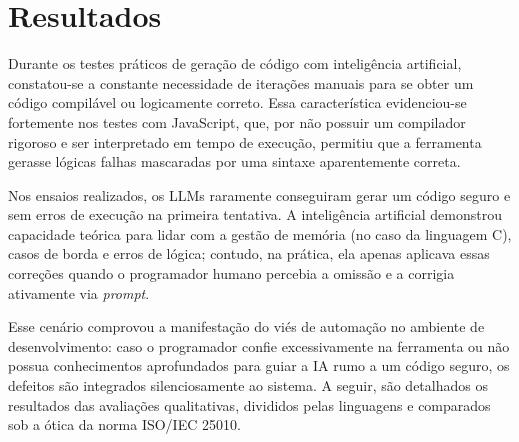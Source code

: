 \chapter{Resultados}

Durante os testes práticos de geração de código com inteligência artificial, constatou-se a constante necessidade de iterações manuais para se obter um código compilável ou logicamente correto. Essa característica evidenciou-se fortemente nos testes com JavaScript, que, por não possuir um compilador rigoroso e ser interpretado em tempo de execução, permitiu que a ferramenta gerasse lógicas falhas mascaradas por uma sintaxe aparentemente correta. 

Nos ensaios realizados, os LLMs raramente conseguiram gerar um código seguro e sem erros de execução na primeira tentativa. A inteligência artificial demonstrou capacidade teórica para lidar com a gestão de memória (no caso da linguagem C), casos de borda e erros de lógica; contudo, na prática, ela apenas aplicava essas correções quando o programador humano percebia a omissão e a corrigia ativamente via \textit{prompt}. 

Esse cenário comprovou a manifestação do viés de automação no ambiente de desenvolvimento: caso o programador confie excessivamente na ferramenta ou não possua conhecimentos aprofundados para guiar a IA rumo a um código seguro, os defeitos são integrados silenciosamente ao sistema. A seguir, são detalhados os resultados das avaliações qualitativas, divididos pelas linguagens e comparados sob a ótica da norma ISO/IEC 25010.

